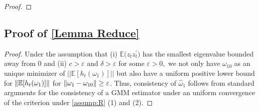 \documentclass[11pt, letterpaper, twoside]{article}
\begin{document}
\begin{appendices}
\begin{proof}
\end{proof}

\subsection{\texorpdfstring{Proof of \cref{Lemma Reduce}}{Proof of Lemma 2}}

\begin{proof}

    Under the assumption that (i) $ \mathbb{E(}z_{t}z_{t}^{\prime })$ has the smallest eigenvalue bounded away from 0 and (ii) $c>\varepsilon $ and $\delta >\varepsilon $ for some $ \varepsilon >0,$ we not only have $\omega _{10}$ as an unique minimizer of $||\mathbb{E}[h_{t}(\omega _{1})]||$ but also have a uniform positive lower bound for $\lVert\operatorname{\mathbb{E}}[h_{t}(\omega _{1})]\rVert$ for $\lVert\omega _{1}-\omega _{10}\rVert \geq \varepsilon$. Thus, consistency of $\widehat{\omega }_{1}$ follows from standard arguments for the consistency of a GMM estimator under an uniform convergence of the criterion under \cref{assump:R} (1) and (2).


\end{proof}
\end{appendices}
\end{document}
